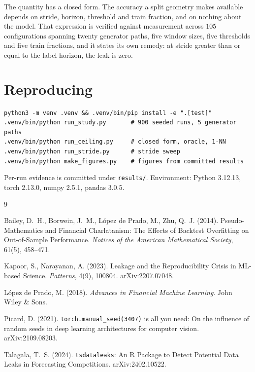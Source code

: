 \documentclass[11pt,a4paper]{article}
\begin{document}
The quantity has a closed form. The accuracy a split geometry makes available
depends on stride, horizon, threshold and train fraction, and on nothing about
the model. That expression is verified against measurement across $105$
configurations spanning twenty generator paths, five window sizes, five
thresholds and five train fractions, and it states its own remedy: at stride
greater than or equal to the label horizon, the leak is zero.

\section*{Reproducing}

\begin{verbatim}
python3 -m venv .venv && .venv/bin/pip install -e ".[test]"
.venv/bin/python run_study.py       # 900 seeded runs, 5 generator paths
.venv/bin/python run_ceiling.py     # closed form, oracle, 1-NN
.venv/bin/python run_stride.py      # stride sweep
.venv/bin/python make_figures.py    # figures from committed results
\end{verbatim}

\noindent
Per-run evidence is committed under \texttt{results/}. Environment: Python
3.12.13, torch 2.13.0, numpy 2.5.1, pandas 3.0.5.

\begin{thebibliography}{9}

Bailey, D.~H., Borwein, J.~M., López de Prado, M., Zhu, Q.~J. (2014).
Pseudo-Mathematics and Financial Charlatanism: The Effects of Backtest
Overfitting on Out-of-Sample Performance.
\emph{Notices of the American Mathematical Society}, 61(5), 458--471.

Kapoor, S., Narayanan, A. (2023).
Leakage and the Reproducibility Crisis in ML-based Science.
\emph{Patterns}, 4(9), 100804. arXiv:2207.07048.

López de Prado, M. (2018).
\emph{Advances in Financial Machine Learning}. John Wiley \& Sons.

Picard, D. (2021).
\texttt{torch.manual\_seed(3407)} is all you need: On the influence of random
seeds in deep learning architectures for computer vision. arXiv:2109.08203.

Talagala, T.~S. (2024).
\texttt{tsdataleaks}: An R Package to Detect Potential Data Leaks in Forecasting
Competitions. arXiv:2402.10522.

\end{thebibliography}
\end{document}
